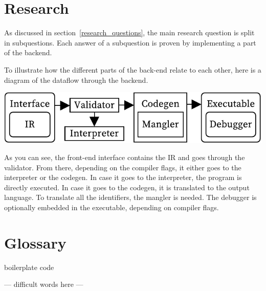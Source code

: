 \documentclass[10pt,a4paper]{article}
\begin{document}
\pagestyle{empty} 


\newpage

\setcounter{secnumdepth}{2} 
\setcounter{tocdepth}{2}

\setcounter{page}{1}
\pagestyle{plain}

\begin{multicols}{2}
\tableofcontents




\section{Research}
As discussed in section~\ref{research_questions}, the main research question is split in subquestions.
Each answer of a subquestion is proven by implementing a part of the backend. 

To illustrate how the different parts of the back-end relate to each other, here is a diagram of the dataflow through the backend.

\includegraphics[width=\columnwidth]{overview}

As you can see, the front-end interface contains the IR and goes through the validator.
From there, depending on the compiler flags, it either goes to the interpreter or the codegen.
In case it goes to the interpreter, the program is directly executed.
In case it goes to the codegen, it is translated to the output language.
To translate all the identifiers, the mangler is needed.
The debugger is optionally embedded in the executable, depending on compiler flags.











\setcounter{section}{0}
\renewcommand\thesection{\Alph{section}}
\section{Glossary}
boilerplate code

--- difficult words here ---

\end{multicols}

\printbibliography
\end{document}
